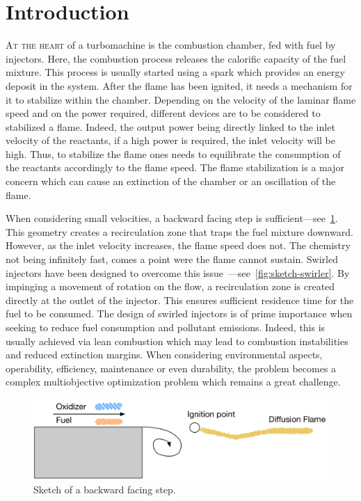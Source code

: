 \newcommand{\pdv}[2]{\frac{\partial{#1}}{\partial{#2}}}
\newcommand{\tilda}[1]{\tilde{#1}}

\section{Introduction}\label{sec:intro}

\lettrine{A}{t the heart} of a turbomachine is the combustion chamber, fed with fuel by injectors. Here, the combustion process releases the calorific capacity of the fuel mixture. This process is usually started using a spark which provides an energy deposit in the system. After the flame has been ignited, it needs a mechanism for it to stabilize within the chamber. Depending on the velocity of the laminar flame speed and on the power required, different devices are to be considered to stabilized a flame. Indeed, the output power being directly linked to the inlet velocity of the reactants, if a high power is required, the inlet velocity will be high. Thus, to stabilize the flame ones needs to equilibrate the consumption of the reactants accordingly to the flame speed. The flame stabilization is a major concern which can cause an extinction of the chamber or an oscillation of the flame.

 When considering small velocities, a backward facing step is sufficient---see~\cref{fig:sketch-step}. This geometry creates a recirculation zone that traps the fuel mixture downward. However, as the inlet velocity increases, the flame speed does not. The chemistry not being infinitely fast, comes a point were the flame cannot sustain. Swirled injectors have been designed to overcome this issue~\cite{Lilley1977}---see~\cref{fig:sketch-swirler}. By impinging a movement of rotation on the flow, a recirculation zone is created directly at the outlet of the injector. This ensures sufficient residence time for the fuel to be consumed. The design of swirled injectors is of prime importance when seeking to reduce fuel consumption and pollutant emissions. Indeed, this is usually achieved via lean combustion which may lead to combustion instabilities and reduced extinction margins. When considering environmental aspects, operability, efficiency, maintenance or even durability, the problem becomes a complex multiobjective optimization problem which remains a great challenge.

\begin{figure}[!h]
\centering
\includegraphics[width=\linewidth,keepaspectratio]{fig/applications/swirler/sketch_step.pdf}
\caption{Sketch of a backward facing step.}
\label{fig:sketch-step}
\end{figure}

